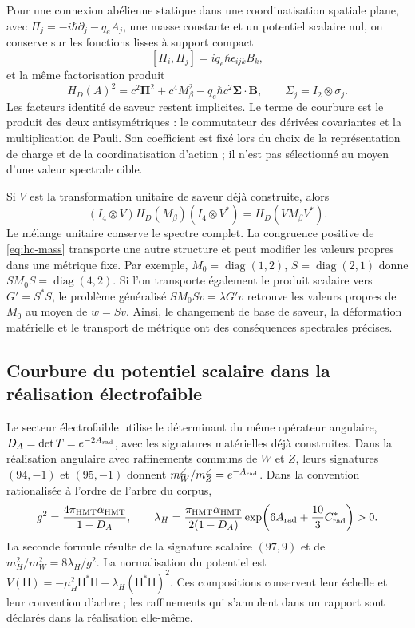 Pour une connexion abélienne statique dans une coordinatisation spatiale plane, avec \(\Pi_j=-i\hbar\partial_j-q_eA_j\), une masse constante et un potentiel scalaire nul, on conserve sur les fonctions lisses à support compact
\[
 [\Pi_i,\Pi_j]=iq_e\hbar\epsilon_{ijk}B_k,
\]
et la même factorisation produit
\begin{equation}
 H_D(A)^2=c^2\boldsymbol\Pi^2+c^4M_\beta^2
 -q_e\hbar c^2\boldsymbol\Sigma\cdot\mathbf B,
 \qquad \Sigma_j=I_2\otimes\sigma_j.
 \label{eq:hc-dirac-curvature}
\end{equation}
Les facteurs identité de saveur restent implicites. Le terme de courbure est le produit des deux antisymétriques : le commutateur des dérivées covariantes et la multiplication de Pauli. Son coefficient est fixé lors du choix de la représentation de charge et de la coordinatisation d'action ; il n'est pas sélectionné au moyen d'une valeur spectrale cible.

Si \(V\) est la transformation unitaire de saveur déjà construite, alors
\[
 (I_4\otimes V)H_D(M_\beta)(I_4\otimes V^*)
 =H_D(VM_\beta V^*).
\]
Le mélange unitaire conserve le spectre complet. La congruence positive
de \eqref{eq:hc-mass} transporte une autre structure et peut modifier les
valeurs propres dans une métrique fixe. Par exemple,
\(M_0=\operatorname{diag}(1,2)\), \(S=\operatorname{diag}(2,1)\)
donne \(SM_0S=\operatorname{diag}(4,2)\). Si l’on transporte également le
produit scalaire vers \(G'=S^*S\), le problème généralisé
\(SM_0Sv=\lambda G'v\) retrouve les valeurs propres de \(M_0\)
au moyen de \(w=Sv\). Ainsi, le changement de base de saveur, la déformation
matérielle et le transport de métrique ont des conséquences spectrales précises.

\subsection{Courbure du potentiel scalaire dans la réalisation électrofaible}

Le secteur électrofaible utilise le déterminant du même opérateur angulaire, \(D_A=\det T=e^{-2A_{\rm rad}}\), avec les signatures matérielles déjà construites. Dans la réalisation angulaire avec raffinements communs de \(W\) et \(Z\), leurs signatures \((94,-1)\) et \((95,-1)\) donnent \(m_W^\angle/m_Z^\angle=e^{-A_{\rm rad}}\). Dans la convention rationalisée à l'ordre de l'arbre du corpus,
\[
 g^2=\frac{4\pi_{\rm HMT}\alpha_{\rm HMT}}{1-D_A},\qquad
 \lambda_H=\frac{\pi_{\rm HMT}\alpha_{\rm HMT}}{2(1-D_A)}
 \exp\!\left(6A_{\rm rad}+\frac{10}3C^*_{\rm rad}\right)>0.
\]
La seconde formule résulte de la signature scalaire \((97,9)\) et de
\(m_H^2/m_W^2=8\lambda_H/g^2\). La normalisation du potentiel est
\(V(\mathsf H)=-\mu_H^2\mathsf H^*\mathsf H
+\lambda_H(\mathsf H^*\mathsf H)^2\). Ces compositions conservent
leur échelle et leur convention d’arbre ; les raffinements qui s’annulent
dans un rapport sont déclarés dans la réalisation elle-même.

